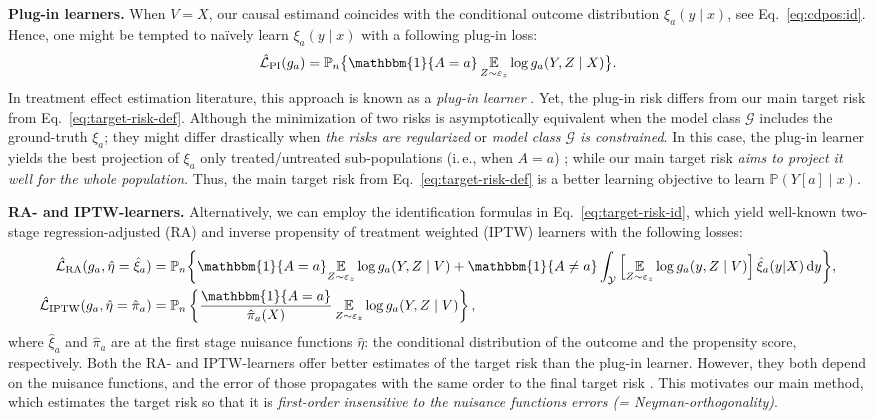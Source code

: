 \documentclass[dvipsnames]{article} %
\newcommand\ie{i.\,e.\xspace}
\newcommand*\diff{\mathop{}\!\mathrm{d}}
\begin{document}
\textbf{Plug-in learners.} When $V = X$, our causal estimand coincides with the conditional outcome distribution $\xi_a(y\mid x)$, see Eq.~\eqref{eq:cdpos:id}. Hence, one might be tempted to na\"ively learn $\xi_a(y\mid x)$ with a following plug-in loss:
\begin{equation}
    \hat{\mathcal{L}}_\text{PI}(g_a)=  \mathbb{P}_n \big\{ \mathbbm{1}\{A = a\}\, \underset{Z \sim \varepsilon_z }{\mathbb{E}} \log g_a(Y, Z \mid X) \big\}.
\end{equation}
In treatment effect estimation literature, this approach is known as a \emph{plug-in learner} \citep{kunzel2019metalearners,morzywolek2023general,vansteelandt2025orthogonal}. Yet, the plug-in risk differs from our main target risk from Eq.~\eqref{eq:target-risk-def}. Although the minimization of two risks is asymptotically equivalent when the model class $\mathcal{G}$ includes the ground-truth $\xi_a$; they might differ drastically when \emph{the risks are regularized} or \emph{model class $\mathcal{G}$ is constrained}. In this case, the plug-in learner yields the best projection of $\xi_a$ only treated/untreated sub-populations (\ie, when $A = a$) \citep{vansteelandt2025orthogonal}; while our main target risk \emph{aims to project it well for the whole population}. Thus, the main target risk from Eq.~\eqref{eq:target-risk-def} is a better learning objective to learn $\mathbb{P}(Y[a] \mid x)$. 

\textbf{RA- and IPTW-learners.} Alternatively, we can employ the identification formulas in Eq.~\eqref{eq:target-risk-id}, which yield well-known two-stage regression-adjusted (RA) and inverse propensity of treatment weighted (IPTW) learners with the following losses:
\begingroup\makeatletter\def\f@size{9}\check@mathfonts
\begin{align}
    \hat{\mathcal{L}}_\text{RA}(g_a, \hat{\eta} =\hat{\xi}_a) &= \mathbb{P}_n \bigg\{\mathbbm{1}\{A = a\} \underset{Z \sim \varepsilon_z }{\mathbb{E}} \log g_a(Y, Z \mid V) +  \mathbbm{1}\{A \neq a\}\int_\mathcal{Y} \Big[\underset{Z \sim \varepsilon_z }{\mathbb{E}} \log g_a(y, Z \mid V) \Big] \, \hat{\xi}_a(y | X) \diff{y} \bigg\},\\
    \hat{\mathcal{L}}_\text{IPTW}(g_a, \hat{\eta} = \hat{\pi}_a) & = \mathbb{P}_n\left\{\frac{\mathbbm{1}\{A = a\}}{\hat{\pi}_a(X)} \, \underset{Z \sim \varepsilon_z }{\mathbb{E}} \log g_a(Y, Z \mid V)\right\},
\end{align}
\endgroup
where $\hat{\xi}_a$ and $\hat{\pi}_a$ are at the first stage nuisance functions $\hat{\eta}$: the conditional distribution of the outcome and the propensity score, respectively. Both the RA- and IPTW-learners offer better estimates of the target risk than the plug-in learner. However, they both depend on the nuisance functions, and the error of those propagates with the same order to the final target risk \citep{vansteelandt2025orthogonal}. This motivates our main method, which estimates the target risk so that it is \emph{first-order insensitive to the nuisance functions errors (= Neyman-orthogonality)}.
\end{document}
